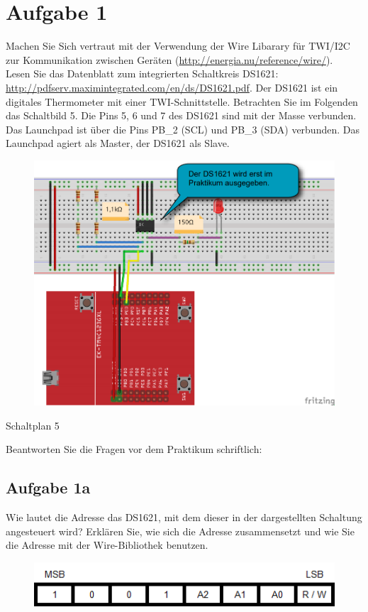 \newpage
\section{Aufgabe 1}
Machen Sie Sich vertraut mit der Verwendung der Wire Libarary für TWI/I2C zur Kommunikation zwischen Geräten (\url{http://energia.nu/reference/wire/}).\\
Lesen Sie das Datenblatt zum integrierten Schaltkreis DS1621:\\
\url{http://pdfserv.maximintegrated.com/en/ds/DS1621.pdf}. Der DS1621 ist ein digitales Thermometer mit einer TWI-Schnittstelle. Betrachten Sie im Folgenden das Schaltbild 5. Die Pins 5, 6 und 7 des DS1621 sind mit der Masse verbunden. Das Launchpad ist über die Pins PB\_2 (SCL) und PB\_3 (SDA) verbunden. Das Launchpad agiert als Master, der DS1621 als Slave.
\begin{figure}[h]
	\centering
	\includegraphics[width=0.5\linewidth]{images/Schaltplan5}
	\label{fig:Schaltplan5}
\end{figure}
\begin{center}
	Schaltplan 5
\end{center}
Beantworten Sie die Fragen vor dem Praktikum schriftlich:
\subsection{Aufgabe 1a}
Wie lautet die Adresse das DS1621, mit dem dieser in der dargestellten Schaltung angesteuert wird? Erklären Sie, wie sich die Adresse zusammensetzt und wie Sie die Adresse mit der Wire-Bibliothek benutzen.
\begin{figure}[h!]
\centering
\includegraphics[width=0.7\linewidth]{images/SlaveAdresse}
\label{fig:SlaveAdresse}
\end{figure}

